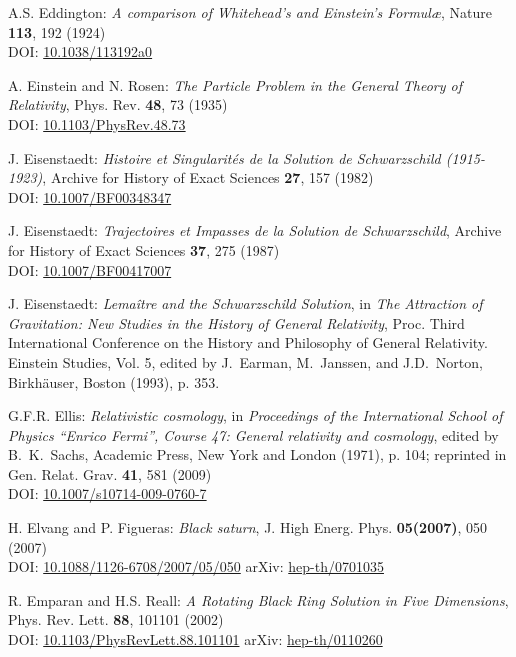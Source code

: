 \begin{thebibliography}{123}
A.S. Eddington: {\em A comparison of Whitehead's and Einstein's Formul\ae},
Nature {\bf 113}, 192 (1924) \\
DOI: \href{https://doi.org/10.1038/113192a0}{10.1038/113192a0}

A. Einstein and N. Rosen:
{\em The Particle Problem in the General Theory of Relativity},
Phys. Rev. {\bf 48}, 73 (1935) \\
DOI: \href{https://doi.org/10.1103/PhysRev.48.73}{10.1103/PhysRev.48.73}

J. Eisenstaedt:
{\em Histoire et Singularit\'es de la Solution de Schwarzschild (1915-1923)},
Archive for History of Exact Sciences {\bf 27}, 157 (1982) \\
DOI: \href{https://doi.org/10.1007/BF00348347}{10.1007/BF00348347}

J. Eisenstaedt:
{\em Trajectoires et Impasses de la Solution de Schwarzschild},
Archive for History of Exact Sciences {\bf 37}, 275 (1987) \\
DOI: \href{https://doi.org/10.1007/BF00417007}{10.1007/BF00417007}

J. Eisenstaedt: {\em Lemaître and the Schwarzschild Solution}, in
{\em The Attraction of Gravitation: New Studies in the History of
General Relativity}, Proc. Third International Conference on the History and Philosophy of General Relativity. Einstein
Studies, Vol. 5, edited by J.~Earman, M.~Janssen, and J.D.~Norton,
Birkhäuser, Boston (1993), p. 353.

G.F.R. Ellis:
{\em Relativistic cosmology},
in  {\em Proceedings of the International School of Physics ``Enrico Fermi'',
Course 47: General relativity and cosmology}, edited by B.~K.~Sachs,
Academic Press, New York and London (1971), p. 104;
reprinted in Gen. Relat. Grav. {\bf 41}, 581 (2009)\\
DOI: \href{https://doi.org/10.1007/s10714-009-0760-7}{10.1007/s10714-009-0760-7}

H. Elvang and P. Figueras:
{\em Black saturn},
J. High Energ. Phys. {\bf 05(2007)}, 050 (2007)\\
DOI: \href{https://doi.org/10.1088/1126-6708/2007/05/050}{10.1088/1126-6708/2007/05/050}\hfill
arXiv: \href{https://arxiv.org/abs/hep-th/0701035}{hep-th/0701035}

R. Emparan and H.S. Reall:
{\em A Rotating Black Ring Solution in Five Dimensions},
Phys. Rev. Lett. {\bf 88}, 101101 (2002)\\
DOI: \href{https://doi.org/10.1103/PhysRevLett.88.101101}{10.1103/PhysRevLett.88.101101}\hfill
arXiv: \href{https://arxiv.org/abs/hep-th/0110260}{hep-th/0110260}


\end{thebibliography}
